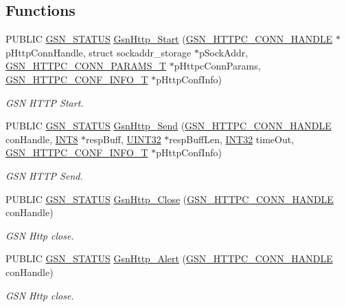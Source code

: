 \subsection*{Functions}
\begin{DoxyCompactItemize}
\item 
PUBLIC \hyperlink{a00660_gada5951904ac6110b1fa95e51a9ddc217}{GSN\_\-STATUS} \hyperlink{a00665_gafac7279103004f23215fe92a28ed0331}{GsnHttp\_\-Start} (\hyperlink{a00665_ga873d4cd3603c5dd91494d571445cc7f7}{GSN\_\-HTTPC\_\-CONN\_\-HANDLE} $\ast$pHttpConnHandle, struct sockaddr\_\-storage $\ast$pSockAddr, \hyperlink{a00094}{GSN\_\-HTTPC\_\-CONN\_\-PARAMS\_\-T} $\ast$pHttpcConnParams, \hyperlink{a00093}{GSN\_\-HTTPC\_\-CONF\_\-INFO\_\-T} $\ast$pHttpConfInfo)
\begin{DoxyCompactList}\small\item\em GSN HTTP Start. \end{DoxyCompactList}\item 
PUBLIC \hyperlink{a00660_gada5951904ac6110b1fa95e51a9ddc217}{GSN\_\-STATUS} \hyperlink{a00665_ga588ccc3a99fdf23a18c4878cbb0676f1}{GsnHttp\_\-Send} (\hyperlink{a00665_ga873d4cd3603c5dd91494d571445cc7f7}{GSN\_\-HTTPC\_\-CONN\_\-HANDLE} conHandle, \hyperlink{a00660_ga307b8734c020247f6bac4fcde0dcfbb9}{INT8} $\ast$respBuff, \hyperlink{a00660_gae1e6edbbc26d6fbc71a90190d0266018}{UINT32} $\ast$respBuffLen, \hyperlink{a00660_ga63021d67d54286c2163bcdb43a6f2569}{INT32} timeOut, \hyperlink{a00093}{GSN\_\-HTTPC\_\-CONF\_\-INFO\_\-T} $\ast$pHttpConfInfo)
\begin{DoxyCompactList}\small\item\em GSN HTTP Send. \end{DoxyCompactList}\item 
PUBLIC \hyperlink{a00660_gada5951904ac6110b1fa95e51a9ddc217}{GSN\_\-STATUS} \hyperlink{a00665_ga8169ad9597abcfa2dff5ecdca26f1163}{GsnHttp\_\-Close} (\hyperlink{a00665_ga873d4cd3603c5dd91494d571445cc7f7}{GSN\_\-HTTPC\_\-CONN\_\-HANDLE} conHandle)
\begin{DoxyCompactList}\small\item\em GSN Http close. \end{DoxyCompactList}\item 
PUBLIC \hyperlink{a00660_gada5951904ac6110b1fa95e51a9ddc217}{GSN\_\-STATUS} \hyperlink{a00665_ga3a85b2994357240f240544aa83f738e9}{GsnHttp\_\-Alert} (\hyperlink{a00665_ga873d4cd3603c5dd91494d571445cc7f7}{GSN\_\-HTTPC\_\-CONN\_\-HANDLE} conHandle)
\begin{DoxyCompactList}\small\item\em GSN Http close. \end{DoxyCompactList}\end{DoxyCompactItemize}


